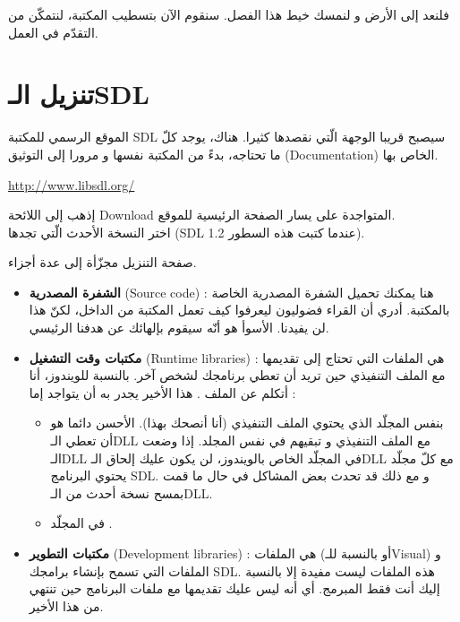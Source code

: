 فلنعد إلى الأرض و لنمسك خيط هذا الفصل. سنقوم الآن بتسطيب المكتبة، لنتمكّن من التقدّم في العمل.

\section{تنزيل الـ\textenglish{SDL}}

الموقع الرسمي للمكتبة 
\textenglish{SDL}
سيصبح قريبا الوجهة الّتي نقصدها كثيرا. هناك، يوجد كلّ ما تحتاجه، بدءً من المكتبة نفسها و مرورا إلى التوثيق 
(\textenglish{Documentation})
الخاص بها.

\url{http://www.libsdl.org/}

إذهب إلى اللائحة
\textenglish{Download}
المتواجدة على يسار الصفحة الرئيسية للموقع.\\
اختر النسخة الأحدث الّتي تجدها
(\textenglish{SDL 1.2}
عندما كتبت هذه السطور).

صفحة التنزيل مجزّأة إلى عدة أجزاء. 

\begin{itemize}
	\item \textbf{الشفرة المصدرية}
	(\textenglish{Source code}) :
هنا يمكنك تحميل الشفرة المصدرية الخاصة بالمكتبة. أدري أن القراء فضوليون ليعرفوا كيف تعمل المكتبة من الداخل، لكنّ هذا لن يفيدنا. الأسوأ هو أنّه سيقوم بإلهائك عن هدفنا الرئيسي.
	\item \textbf{مكتبات وقت التشغيل}
	(\textenglish{Runtime libraries}) :
	هي الملفات التي تحتاج إلى تقديمها مع الملف التنفيذي حين تريد أن تعطي برنامجك لشخص آخر. بالنسبة للويندوز، أنا أتكلم عن الملف 
	.
	هذا الأخير يجدر به أن يتواجد إما :
	
	\begin{itemize}
		\item بنفس المجلّد الذي يحتوي الملف التنفيذي
		(أنا أنصحك بهذا). الأحسن دائما هو أن تعطي الـ\textenglish{DLL}
		مع الملف التنفيذي و تبقيهم في نفس المجلد. إذا وضعت الـ\textenglish{DLL}
		في المجلّد الخاص بالويندوز، لن يكون عليك إلحاق الـ\textenglish{DLL}
		مع كلّ مجلّد يحتوي البرنامج
		\textenglish{SDL}.
		و مع ذلك قد تحدث بعض المشاكل في حال ما قمت بمسح نسخة أحدث من الـ\textenglish{DLL}.
		\item في المجلّد
		.
	\end{itemize}
	
	\item \textbf{مكتبات التطوير}
	(\textenglish{Development libraries}) :
	هي الملفات
	(أو
	بالنسبة للـ\textenglish{Visual})
	و الملفات 
	التي تسمح بإنشاء برامجك
	\textenglish{SDL}.
	هذه الملفات ليست مفيدة إلا بالنسبة إليك أنت فقط المبرمج. أي أنه ليس عليك تقديمها مع ملفات البرنامج حين تنتهي من هذا الأخير.
\end{itemize}

